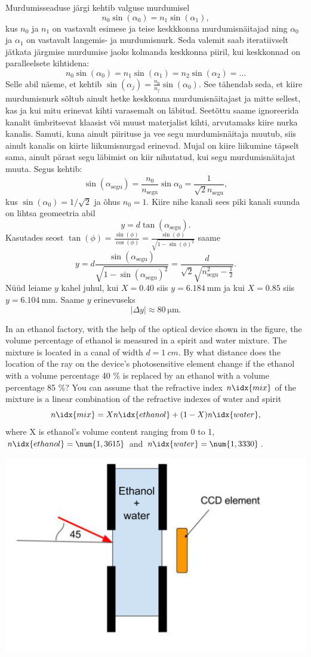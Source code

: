 {\ifSolution
Murdumisseaduse järgi kehtib valguse murdumisel
$$n_0\sin(\alpha_0)=n_1\sin(\alpha_1),$$
kus $n_0$ ja $n_1$ on vastavalt esimese ja teise keskkkonna murdumisnäitajad ning $\alpha_0$ ja $\alpha_1$ on vastavalt langemis- ja murdumisnurk. Seda valemit saab iteratiivselt jätkata järgmise murdumise jaoks kolmanda keskkonna piiril, kui keskkonnad on paralleelsete kihtidena:
$$n_0\sin(\alpha_0)=n_1\sin(\alpha_1)=n_2\sin(\alpha_2) = \dots$$
Selle abil näeme, et kehtib $\sin(\alpha_j)=\frac{n_0}{n_j}\sin(\alpha_0)$. See tähendab seda, et kiire murdumisnurk sõltub ainult hetke keskkonna murdumisnäitajast ja mitte sellest, kas ja kui mitu erinevat kihti varasemalt on läbitud. Seetõttu saame ignoreerida kanalit ümbritsevat klaasist või muust materjalist kihti, arvutamaks kiire nurka kanalis. Samuti, kuna ainult piirituse ja vee segu murdumisnäitaja muutub, siis ainult kanalis on kiirte liikumisnurgad erinevad. Mujal on kiire liikumine täpselt sama, ainult pärast segu läbimist on kiir nihutatud, kui segu murdumisnäitajat muuta. Segus kehtib:
$$\sin(\alpha_{\text{segu}})=\frac{n_0}{n_{\text{segu}}}\sin{\alpha_0} = \frac{1}{\sqrt{2}n_{\text{segu}}},$$
kus $\sin(\alpha_0) = 1/\sqrt{2}$ ja õhus $n_0=1$. Kiire nihe kanali sees piki kanali suunda on lihtsa geomeetria abil $$y=d\tan(\alpha_{\text{segu}}).$$
Kasutades seost $\tan(\phi) = \frac{\sin(\phi)}{\cos(\phi)} = \frac{\sin(\phi)}{\sqrt{1-\sin(\phi)^2}}$ saame
$$y = d \frac{\sin(\alpha_{\text{segu}})}{\sqrt{1-\sin(\alpha_{\text{segu}})^2}} = \frac{d}{\sqrt{2}\sqrt{n_{\text{segu}}^2-\frac12}}.$$
Nüüd leiame $y$ kahel juhul, kui $X=\num{0.40}$ siis $y=\SI{6.184}{\milli\meter}$ ja kui $X=\num{0.85}$ siis $y=\SI{6.104}{\milli\meter}$. Saame $y$ erinevuseks
$$|\Delta y| \approx \SI{80}{\micro\meter}.$$
\fi


\ifEngStatement
In an ethanol factory, with the help of the optical device shown in the figure, the volume percentage of ethanol is measured in a spirit and water mixture. The mixture is located in a canal of width $d=\SI{1}{cm}$. By what distance does the location of the ray on the device's photosensitive element change if the ethanol with a volume percentage 40 \% is replaced by an ethanol with a volume percentage 85 \%? You can assume that the refractive index $n\idx{mix}$ of the mixture is a linear combination of the refractive indexes of water and spirit
$$
n\idx{mix}=Xn\idx{ethanol}+(1-X)n\idx{water},
$$
where X is ethanol’s volume content ranging from 0 to 1, $n\idx{ethanol}=\num{1,3615}$ and $n\idx{water}=\num{1,3330}$.
\begin{center}
	\vspace{-0pt}
	\includegraphics[width=0.5\linewidth]{2017-v2g-04-Piiritusetehas_ing}
	\vspace{-10pt}
\end{center}
\fi


}
